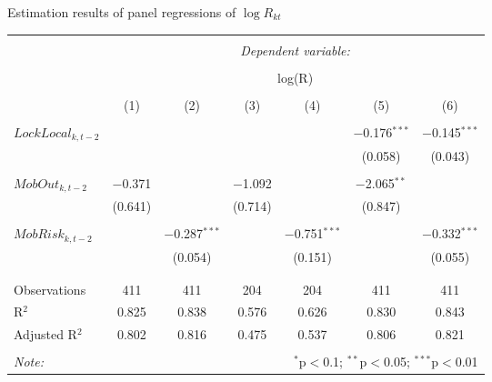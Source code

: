   \caption{Estimation results of panel regressions of $\log R_{kt}$} 
  \label{} 
\small 
\begin{tabular}{@{\extracolsep{5pt}}lcccccc} 
\\[-1.8ex]\hline 
\hline \\[-1.8ex] 
 & \multicolumn{6}{c}{\textit{Dependent variable:}} \\ 
\cline{2-7} 
\\[-1.8ex] & \multicolumn{6}{c}{log(R)} \\ 
\\[-1.8ex] & (1) & (2) & (3) & (4) & (5) & (6)\\ 
\hline \\[-1.8ex] 
 $LockLocal_{k,t-2}$ &  &  &  &  & $-$0.176$^{***}$ & $-$0.145$^{***}$ \\ 
  &  &  &  &  & (0.058) & (0.043) \\ 
  & & & & & & \\ 
 $MobOut_{k,t-2}$ & $-$0.371 &  & $-$1.092 &  & $-$2.065$^{**}$ &  \\ 
  & (0.641) &  & (0.714) &  & (0.847) &  \\ 
  & & & & & & \\ 
 $MobRisk_{k,t-2}$ &  & $-$0.287$^{***}$ &  & $-$0.751$^{***}$ &  & $-$0.332$^{***}$ \\ 
  &  & (0.054) &  & (0.151) &  & (0.055) \\ 
  & & & & & & \\ 
\hline \\[-1.8ex] 
Observations & 411 & 411 & 204 & 204 & 411 & 411 \\ 
R$^{2}$ & 0.825 & 0.838 & 0.576 & 0.626 & 0.830 & 0.843 \\ 
Adjusted R$^{2}$ & 0.802 & 0.816 & 0.475 & 0.537 & 0.806 & 0.821 \\ 
\hline 
\hline \\[-1.8ex] 
\textit{Note:}  & \multicolumn{6}{r}{$^{*}$p$<$0.1; $^{**}$p$<$0.05; $^{***}$p$<$0.01} \\ 
\end{tabular} 